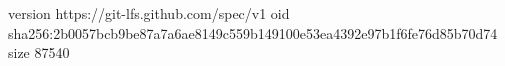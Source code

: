 version https://git-lfs.github.com/spec/v1
oid sha256:2b0057bcb9be87a7a6ae8149c559b149100e53ea4392e97b1f6fe76d85b70d74
size 87540
